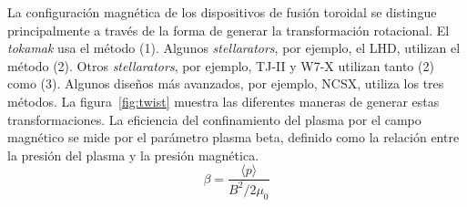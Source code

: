 \par
La configuración magnética de los dispositivos de fusión toroidal se distingue principalmente
a través de la forma de generar la transformación rotacional. El \textit{tokamak}
usa el método (1). Algunos \textit{stellarators}, por ejemplo, el LHD, utilizan el método (2). Otros \textit{stellarators}, por 
ejemplo, TJ-II y W7-X utilizan tanto (2) como (3). Algunos diseños más avanzados, por ejemplo,
NCSX, utiliza los tres métodos. La figura~\ref{fig:twist} muestra las diferentes maneras de generar estas transformaciones.
La eficiencia del confinamiento del plasma por el campo magnético se mide por
el parámetro plasma beta, definido como la relación entre la presión del plasma y la presión magnética.
\begin{equation}\label{eq:beta}
    \beta=\frac{\langle p\rangle}{B^2/2\mu_0}
\end{equation}